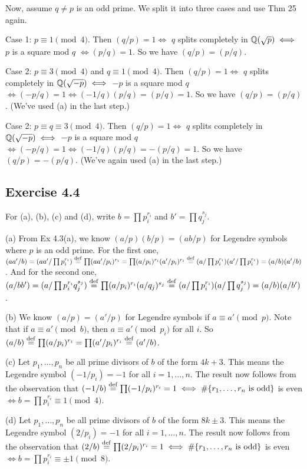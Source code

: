 \documentclass[../Marcus.tex]{subfiles}
\begin{document}
Now, assume $q\neq p$ is an odd prime. We split it into three cases and use Thm 25 again.

Case 1: $p\equiv 1\pmod{4}$. Then $(q/p)=1 \iff$ $q$ splits completely in $\mathbb{Q}(\sqrt{p}) \iff$ $p$ is a square mod $q$ $\iff (p/q)=1$. So we have $(q/p)=(p/q)$.

Case 2: $p\equiv 3\pmod{4}$ and $q\equiv 1\pmod{4}$. Then $(q/p)=1 \iff$ $q$ splits completely in $\mathbb{Q}(\sqrt{-p}) \iff$ $-p$ is a square mod $q$ $\iff (-p/q)=1 \iff (-1/q)(p/q)=(p/q)=1$. So we have $(q/p)=(p/q)$. (We've used (a) in the last step.)

Case 2: $p\equiv q \equiv3\pmod{4}$. Then $(q/p)=1 \iff$ $q$ splits completely in $\mathbb{Q}(\sqrt{-p}) \iff$ $-p$ is a square mod $q$ $\iff (-p/q)=1 \iff (-1/q)(p/q)=-(p/q)=1$. So we have $(q/p)=-(p/q)$. (We've again used (a) in the last step.)

\subsection*{Exercise 4.4}

For (a), (b), (c) and (d), write $b=\prod p_i^{r_i}$ and $b'=\prod q_j^{s_j}$.

(a) From Ex 4.3(a), we know $(a/p)(b/p)=(ab/p)$ for Legendre symbols where $p$ is an odd prime. For the first one, $(aa'/b)=(aa'/\prod p_i^{r_i})\overset{\operatorname{def}}{=}\prod (aa'/p_i)^{r_i}=\prod (a/p_i)^{r_i}(a'/p_i)^{r_i}\overset{\operatorname{def}}{=}(a/\prod p_i^{r_i})(a'/\prod p_i^{r_i})=(a/b)(a'/b)$. And for the second one, $(a/bb')=(a/\prod p_i^{r_i}q_j^{s_j})\overset{\operatorname{def}}{=}\prod (a/p_i)^{r_i}(a/q_j)^{s_j}\overset{\operatorname{def}}{=}(a/\prod p_i^{r_i})(a/\prod q_j^{s_j})=(a/b)(a/b')$.

(b) We know $(a/p)=(a'/p)$ for Legendre symbols if $a\equiv a'\pmod{p}$. Note that if $a\equiv a'\pmod{b}$, then $a\equiv a'\pmod{p_i}$ for all $i$. So $(a/b)\overset{\operatorname{def}}{=}\prod (a/p_i)^{r_i}=\prod (a'/p_i)^{r_i}\overset{\operatorname{def}}{=}(a'/b)$.

(c) Let $p_1,\ldots,p_n$ be all prime divisors of $b$ of the form $4k+3$. This means the Legendre symbol $(-1/p_i)=-1$ for all $i=1,\ldots,n$. The result now follows from the observation that $(-1/b)\overset{\operatorname{def}}{=}\prod (-1/p_i)^{r_i}=1 \iff \#\{r_1,\ldots,r_n \text{ is odd}\}$ is even $\iff b=\prod p_i^{r_i}\equiv 1\pmod{4}$.

(d) Let $p_1,\ldots,p_n$ be all prime divisors of $b$ of the form $8k\pm3$. This means the Legendre symbol $(2/p_i)=-1$ for all $i=1,\ldots,n$. The result now follows from the observation that $(2/b)\overset{\operatorname{def}}{=}\prod (2/p_i)^{r_i}=1 \iff \#\{r_1,\ldots,r_n \text{ is odd}\}$ is even $\iff b=\prod p_i^{r_i}\equiv \pm1\pmod{8}$.
\end{document}

